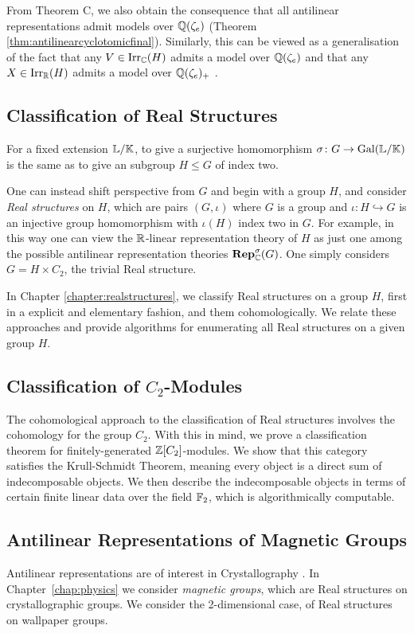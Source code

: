 From Theorem C, we also obtain the consequence that all antilinear representations admit models over ${\mathbb Q}(\zeta_e)$ (Theorem \ref{thm:antilinearcyclotomicfinal}). Similarly, this can be viewed as a generalisation of the fact that any $V \in \operatorname{Irr}_{{\mathbb C}}(H)$ admits a model over ${\mathbb Q}(\zeta_e)$ and that any $X \in \operatorname{Irr}_{{\mathbb R}}(H)$ admits a model over ${\mathbb Q}(\zeta_e)_+$ \cite{PAS}.

\subsection*{Classification of Real Structures}

For a fixed extension ${\mathbb L} / {\mathbb K}$, to give a surjective homomorphism $\sigma \colon G \rightarrow \operatorname{Gal}({\mathbb L} / {\mathbb K})$ is the same as to give an subgroup $H \leq G$ of index two.

One can instead shift perspective from $G$ and begin with a group $H$, and consider \emph{Real structures} on $H$, which are pairs $(G,\iota)$ where $G$ is a group and $\iota \colon H \hookrightarrow G$ is an injective group homomorphism with $\iota(H)$ index two in $G$. For example, in this way one can view the ${\mathbb R}$-linear representation theory of $H$ as just one among the possible antilinear representation theories $\operatorname{\mathbf{Rep}}_{{\mathbb C}}^{\sigma}(G)$.
One simply considers $G = H \times C_2$,  the trivial Real structure.

In Chapter \ref{chapter:realstructures}, we classify Real structures on a group $H$, first in a explicit and elementary fashion, and them cohomologically. We relate these approaches and provide algorithms for enumerating all Real structures on a given group $H$. 


\subsection*{Classification of $C_2$-Modules}
The cohomological approach to the classification of Real structures involves the cohomology for the group $C_2$.
With this in mind, we prove a classification theorem for finitely-generated ${\mathbb Z}[C_2]$-modules. We show that this category satisfies the Krull-Schmidt Theorem, meaning every object is a direct sum of indecomposable objects. We then describe the indecomposable objects in terms of certain finite linear data over the field ${\mathbb F}_2$, which is algorithmically computable.

\subsection*{Antilinear Representations of Magnetic Groups}
Antilinear representations are of interest in Crystallography \cite{Bro, Wills}.
In Chapter~\ref{chap:physics} we consider \emph{magnetic groups}, which are Real structures on crystallographic groups.
We consider the 2-dimensional case, of Real structures on wallpaper groups.

